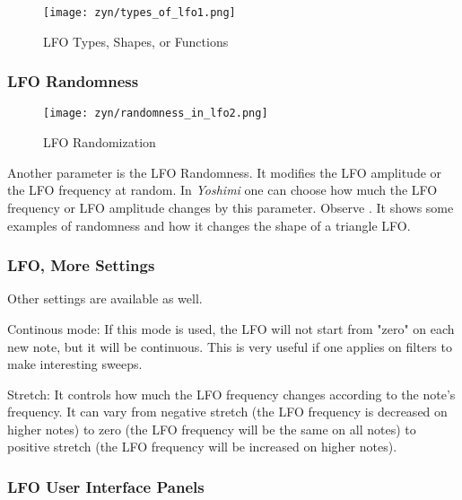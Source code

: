 \begin{figure}[H]
   \centering 
   \texttt{[image: zyn/types\_of\_lfo1.png]}
   \caption[LFO Functions]{LFO Types, Shapes, or Functions}
   \label{fig:types_of_lfo}
\end{figure}

\subsubsection{LFO Randomness}
\label{subsubsec:lfo_randomness}

\begin{figure}[H]
   \centering 
   \texttt{[image: zyn/randomness\_in\_lfo2.png]}
   \caption[LFO Randomization]{LFO Randomization}
   \label{fig:randomness_in_lfo}
\end{figure}

   Another parameter is the LFO Randomness. It modifies the LFO amplitude or
   the LFO frequency at random. In \textsl{Yoshimi}
   one can choose how much the LFO
   frequency or LFO amplitude changes by this parameter.
   Observe .
   It shows some examples of randomness and how it changes the shape of a
   triangle LFO.

\subsubsection{LFO, More Settings}
\label{subsubsec:lfo_more_settings}

   Other settings are available as well.

   Continous mode: If this mode is used, the LFO will not start from "zero" on
   each new note, but it will be continuous. This is very useful if one
   applies on filters to make interesting sweeps.

   Stretch: It controls how much the LFO frequency changes according to the
   note’s frequency. It can vary from negative stretch (the LFO frequency is
   decreased on higher notes) to zero (the LFO frequency will be the same
   on all notes) to positive stretch (the LFO frequency will be
   increased on higher notes).

\subsubsection{LFO User Interface Panels}
\label{subsubsec:lfo_user_interface_panels}

